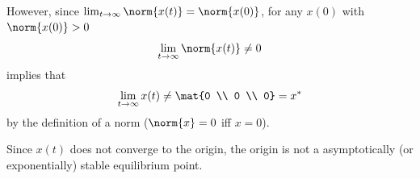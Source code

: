 \documentclass{homework}
\begin{document}
\begin{letterenum}
However, since $\lim_{t\to\infty} \norm{x(t)} = \norm{x(0)}$, for any
$x(0)$ with $\norm{x(0)} > 0$
\begin{equation*}
    \lim_{t\to\infty} \norm{x(t)} \neq 0
\end{equation*}
implies that 
\begin{equation*}
    \lim_{t\to\infty} x(t) \neq \mat{0 \\ 0 \\ 0} = x^*
\end{equation*}
by the definition of a norm ($\norm{x} = 0$ iff $x = 0$).

Since $x(t)$ does not converge to the origin, the origin is not a
asymptotically (or exponentially) stable equilibrium point.





\end{letterenum}
\end{document}
